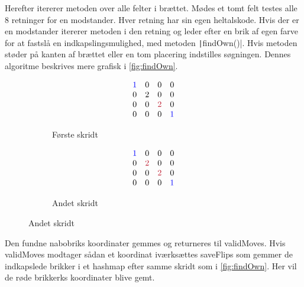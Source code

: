 Herefter itererer metoden over alle felter i brættet. Mødes et tomt felt testes alle 8 retninger for en modstander. Hver retning har sin egen heltalskode. Hvis der er en modstander itererer metoden i den retning og leder efter en brik af egen farve for at fastslå en indkapslingsmulighed, med metoden \texttt|findOwn()|. Hvis metoden støder på kanten af brættet eller en tom placering indstilles søgningen. Dennes algoritme beskrives mere grafisk i \cref{fig:findOwn}.
\begin{figure}[H]
    \centering
    \caption{\texttt|findOwn()| leder efter en indkapsling i nordvestlig retning (heltalskode 1).}\label{fig:findOwn}
    \begin{subfigure}[t]{.3\textwidth}
        \caption{Første skridt}
        \begin{align*}
            \begin{array}{cccc}
                \color{blue}1 & 0 & 0               & 0             \\
                0             & 2 & 0               & 0             \\
                0             & 0 & \color{DTUred}2 & 0             \\
                0             & 0 & 0               & \color{blue}1
            \end{array}
        \end{align*}
    \end{subfigure}
    \quad
    \begin{subfigure}[t]{.3\textwidth}
        \caption{Andet skridt}
        \begin{align*}
            \begin{array}{cccc}
                \color{blue}1 & 0               & 0               & 0             \\
                0             & \color{DTUred}2 & 0               & 0             \\
                0             & 0               & \color{DTUred}2 & 0             \\
                0             & 0               & 0               & \color{blue}1
            \end{array}
        \end{align*}
    \end{subfigure}
\end{figure}
Den fundne nabobriks koordinater gemmes og returneres til validMoves. Hvis validMoves modtager sådan et koordinat iværksættes saveFlips som gemmer de indkapslede brikker i et hashmap efter samme skridt som i \cref{fig:findOwn}. Her vil de røde brikkerks koordinater blive gemt.\newline
